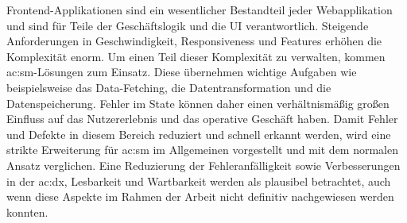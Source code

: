 Frontend-Applikationen sind ein wesentlicher Bestandteil jeder Webapplikation und sind für Teile der Geschäftslogik und die UI verantwortlich. Steigende Anforderungen in Geschwindigkeit, Responsiveness und Features erhöhen die Komplexität enorm. Um einen Teil dieser Komplexität zu verwalten, kommen \acrlong{ac:sm}-Lösungen zum Einsatz. Diese übernehmen wichtige Aufgaben wie beispielsweise das Data-Fetching, die Datentransformation und die Datenspeicherung. Fehler im State können daher einen verhältnismäßig großen Einfluss auf das Nutzererlebnis und das operative Geschäft haben. Damit Fehler und Defekte in diesem Bereich reduziert und schnell erkannt werden, wird eine strikte Erweiterung für \acrlong{ac:sm} im Allgemeinen vorgestellt und mit dem normalen Ansatz verglichen. Eine Reduzierung der Fehleranfälligkeit sowie Verbesserungen in der \acrlong{ac:dx}, Lesbarkeit und Wartbarkeit werden als plausibel betrachtet, auch wenn diese Aspekte im Rahmen der Arbeit nicht definitiv nachgewiesen werden konnten.